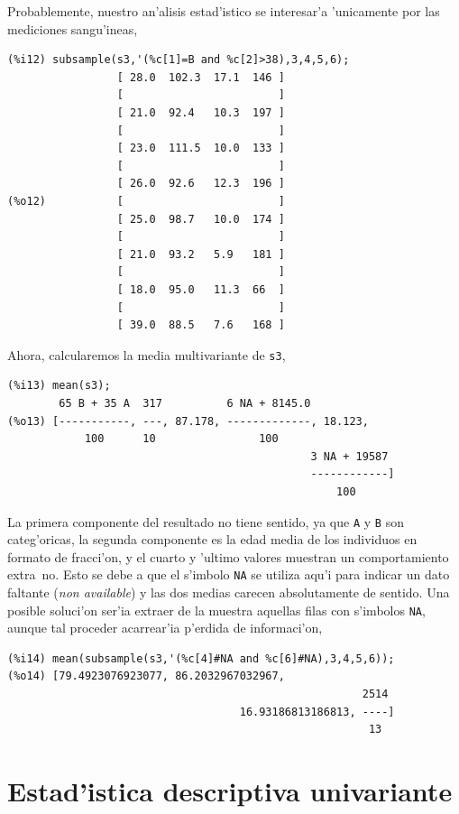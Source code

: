\documentclass[spanish,12pt,a4paper]{article}
\begin{document}
\begin{description}
Probablemente, nuestro an'alisis estad'istico se interesar'a 'unicamente por las mediciones sangu'ineas,
\begin{verbatim}
(%i12) subsample(s3,'(%c[1]=B and %c[2]>38),3,4,5,6);
                 [ 28.0  102.3  17.1  146 ]
                 [                        ]
                 [ 21.0  92.4   10.3  197 ]
                 [                        ]
                 [ 23.0  111.5  10.0  133 ]
                 [                        ]
                 [ 26.0  92.6   12.3  196 ]
(%o12)           [                        ]
                 [ 25.0  98.7   10.0  174 ]
                 [                        ]
                 [ 21.0  93.2   5.9   181 ]
                 [                        ]
                 [ 18.0  95.0   11.3  66  ]
                 [                        ]
                 [ 39.0  88.5   7.6   168 ]
\end{verbatim}

Ahora, calcularemos la media multivariante de \verb|s3|,
\begin{verbatim}
(%i13) mean(s3);
        65 B + 35 A  317          6 NA + 8145.0
(%o13) [-----------, ---, 87.178, -------------, 18.123,
            100      10                100
                                               3 NA + 19587
                                               ------------]
                                                   100
\end{verbatim}
La primera componente del resultado no tiene sentido, ya que \verb|A| y \verb|B| son categ'oricas, la segunda componente es la edad media de los individuos en formato de fracci'on, y el cuarto y 'ultimo valores muestran un comportamiento extra~no. Esto se debe a que el s'imbolo \verb|NA| se utiliza aqu'i para indicar un dato faltante (\emph{non available}) y las dos medias carecen absolutamente de sentido. Una posible soluci'on ser'ia extraer de la muestra aquellas filas con s'imbolos \verb|NA|, aunque tal proceder acarrear'ia p'erdida de informaci'on,
\begin{verbatim}
(%i14) mean(subsample(s3,'(%c[4]#NA and %c[6]#NA),3,4,5,6));
(%o14) [79.4923076923077, 86.2032967032967,
                                                       2514
                                    16.93186813186813, ----]
                                                        13
\end{verbatim}


\end{description}


\section{Estad'istica descriptiva univariante}
\end{document}
